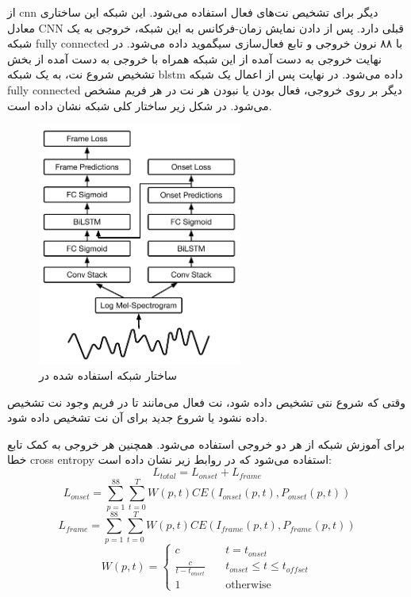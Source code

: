 از \gls{cnn} دیگر برای تشخیص نت‌های فعال استفاده می‌شود. این شبکه این ساختاری
معادل \gls{CNN} قبلی دارد. پس از دادن نمایش زمان-فرکانس به این شبکه، خروجی به یک
شبکه \gls{fully connected} با ۸۸ نرون خروجی و تابع فعال‌سازی سیگموید داده
می‌شود. در نهایت خروجی به دست آمده از این شبکه همراه با خروجی به دست آمده از بخش
تشخیص شروع نت، به یک شبکه \gls{blstm} داده می‌شود. در نهایت پس از اعمال یک شبکه
\gls{fully connected} دیگر بر روی خروجی، فعال بودن یا نبودن هر نت در هر فریم مشخص
می‌شود. در شکل زیر ساختار کلی شبکه نشان داده است.
\begin{figure}[ht]
    \centering
    \includegraphics[height=8cm]{./statics/onset_onframe_architecture.png}
    \caption{ساختار شبکه استفاده شده در \cite{hawthorne2017onsets}}
\end{figure}

وقتی که شروع نتی تشخیص داده شود، نت فعال می‌مانند تا در فریم وجود نت تشخیص داده
نشود یا شروع جدید برای آن نت تشخیص داده شود.

برای آموزش شبکه از هر دو خروجی استفاده می‌شود. همچنین هر خروجی به کمک تابع خطا
\gls{cross entropy} استفاده می‌شود که در روابط زیر نشان داده است:
\begin{equation}
    L_{total} = L_{onset} + L_{frame}
\end{equation}
\begin{equation}
    L_{onset} = \sum_{p=1}^{88} \sum_{t=0}^{T} W(p, t) CE(I_{onset}(p, t), P_{onset}(p, t))
\end{equation}
\begin{equation}
    L_{frame} = \sum_{p=1}^{88} \sum_{t=0}^{T} W(p, t) CE(I_{frame}(p, t), P_{frame}(p, t))
\end{equation}
\begin{equation}
    W(p, t) =
    \begin{cases}
        c &\quad t = t_{onset}\\
        \frac{c}{t - t_{onset}} &\quad t_{onset} \leq t \leq t_{offset}\\
        1 &\quad \text{otherwise}
    \end{cases}
\end{equation}

